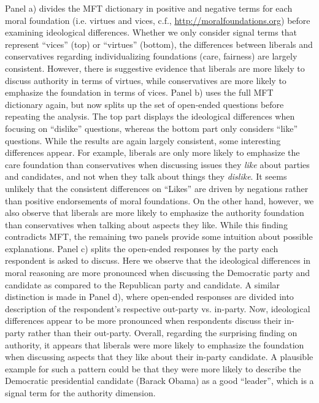 Panel a) divides the MFT dictionary in positive and negative terms for each moral foundation (i.e. virtues and vices, c.f., \url{http://moralfoundations.org}) before examining ideological differences. Whether we only consider signal terms that represent ``vices'' (top) or ``virtues'' (bottom), the differences between liberals and conservatives regarding individualizing foundations (care, fairness) are largely consistent. However, there is suggestive evidence that liberals are more likely to discuss authority in terms of virtues, while conservatives are more likely to emphasize the foundation in terms of vices. Panel b) uses the full MFT dictionary again, but now splits up the set of open-ended questions before repeating the analysis. The top part displays the ideological differences when focusing on ``dislike'' questions, whereas the bottom part only considers ``like'' questions. While the results are again largely consistent, some interesting differences appear. For example, liberals are only more likely to emphasize the care foundation than conservatives when discussing issues they \textit{like} about parties and candidates, and not when they talk about things they \textit{dislike}. It seems unlikely that the consistent differences on ``Likes'' are driven by negations rather than positive endorsements of moral foundations. On the other hand, however, we also observe that liberals are more likely to emphasize the authority foundation than conservatives when talking about aspects they like. While this finding contradicts MFT, the remaining two panels provide some intuition about possible explanations. Panel c) splits the open-ended responses by the party each respondent is asked to discuss. Here we observe that the ideological differences in moral reasoning are more pronounced when discussing the Democratic party and candidate as compared to the Republican party and candidate. A similar distinction is made in Panel d), where open-ended responses are divided into description of the respondent's respective out-party vs. in-party. Now, ideological differences appear to be more pronounced when respondents discuss their in-party rather than their out-party. Overall, regarding the surprising finding on authority, it appears that liberals were more likely to emphasize the foundation when discussing aspects that they like about their in-party candidate. A plausible example for such a pattern could be that they were more likely to describe the Democratic presidential candidate (Barack Obama) as a good ``leader'', which is a signal term for the authority dimension.


